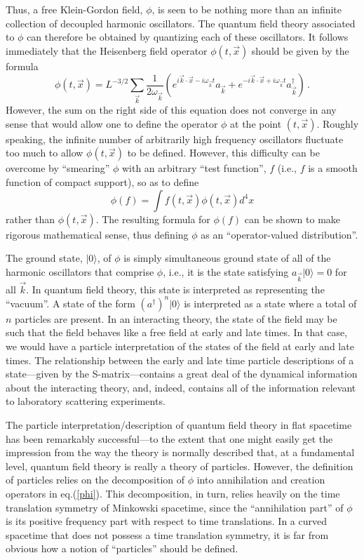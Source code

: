 \documentclass[12pt,epsf,amsfonts,amssymb]{article}
\begin{document}
Thus, a free Klein-Gordon field, $\phi$, is seen to be nothing more
than an infinite collection of decoupled harmonic oscillators. The
quantum field theory associated to $\phi$ can therefore be obtained by
quantizing each of these oscillators. It follows immediately that the
Heisenberg field operator $\phi (t, \vec{x})$ should be given by the formula
\begin{equation}
\phi (t, \vec{x}) = L^{-3/2} \sum_{\vec{k}} \frac{1}{2 \omega_{\vec{k}}}
\left(e^{i \vec{k} \cdot \vec{x} -i \omega_{\vec{k}} t} a_{\vec{k}} 
+ e^{-i \vec{k} \cdot \vec{x} + i \omega_{\vec{k}} t} a^\dagger_{\vec{k}}  
\right) \, .
\label{phi}
\end{equation}
However, the sum on the right side of this equation does not converge
in any sense that would allow one to define the operator $\phi$ at the
point $(t, \vec{x})$. Roughly speaking, the infinite number of arbitrarily
high frequency oscillators fluctuate too much to allow $\phi (t,
\vec{x})$ to be defined. However, this difficulty can be overcome by
``smearing'' $\phi$ with an arbitrary ``test function'', $f$ (i.e., 
$f$ is a smooth
function of compact support), so as to define 
\begin{equation}
\phi(f) = \int f(t, \vec{x}) \phi (t, \vec{x}) d^4x 
\end{equation}
rather than $\phi (t, \vec{x})$. The resulting formula 
for $\phi(f)$ can be shown to make
rigorous mathematical sense, thus defining $\phi$ as an
``operator-valued distribution''.

The ground state, $|0 \rangle$, of $\phi$ is simply simultaneous ground state of all
of the harmonic oscillators that comprise $\phi$, i.e., it is the
state satisfying $a_{\vec{k}} |0 \rangle= 0$ for all $\vec{k}$. In quantum
field theory, this state is interpreted as representing the
``vacuum''. A state of the form $(a^\dagger)^n |0 \rangle$ is interpreted as
a state where a total of $n$ particles are present. In an interacting
theory, the state of the field may be such that the field behaves like
a free field at early and late times. In that case, we would have a
particle interpretation of the states of the field at early and late
times. The relationship between the early and late time particle
descriptions of a state---given by the S-matrix---contains a great
deal of the dynamical information about the interacting theory, and,
indeed, contains all of the information relevant to laboratory
scattering experiments.

The particle interpretation/description of quantum field theory in
flat spacetime has been remarkably successful---to the extent that one
might easily get the impression from the way the theory is normally
described that, at a fundamental level, quantum field theory is really
a theory of particles. However, the definition of particles relies on
the decomposition of $\phi$ into annihilation and creation operators
in eq.(\ref{phi}). This decomposition, in turn, relies heavily on the
time translation symmetry of Minkowski spacetime, since the
``annihilation part'' of $\phi$ is its positive frequency part with
respect to time translations. In a curved spacetime that does not
possess a time translation symmetry, it is far from obvious how a
notion of ``particles'' should be defined.
\end{document}

